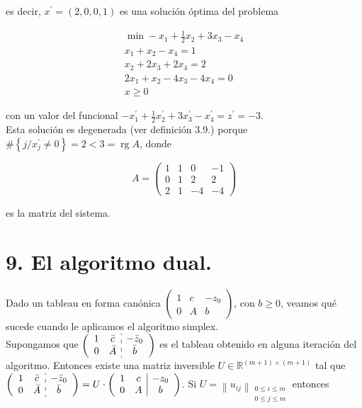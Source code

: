 \documentclass[10pt]{article}
\begin{document}
es decir, $x^{\prime}=(2,0,0,1)$ es una solución óptima del problema

$$
\begin{gathered}
\min -x_{1}+\frac{1}{2} x_{2}+3 x_{3}-x_{4} \\
x_{1}+x_{2}-x_{4}=1 \\
x_{2}+2 x_{3}+2 x_{4}=2 \\
2 x_{1}+x_{2}-4 x_{3}-4 x_{4}=0 \\
x \geq 0
\end{gathered}
$$

con un valor del funcional $-x_{1}^{\prime}+\frac{1}{2} x_{2}^{\prime}+3 x_{3}^{\prime}-x_{4}^{\prime}=z^{\prime}=-3$.\\
Esta solución es degenerada (ver definición 3.9.) porque $\#\left\{j / x_{j}^{\prime} \neq 0\right\}=2<3=\operatorname{rg} A$, donde

$$
A=\left(\begin{array}{cccc}
1 & 1 & 0 & -1 \\
0 & 1 & 2 & 2 \\
2 & 1 & -4 & -4
\end{array}\right)
$$

es la matriz del sistema.

\section*{9. El algoritmo dual.}
Dado un tableau en forma canónica $\left(\begin{array}{cc|c}1 & c & -z_{0} \\ 0 & A & b\end{array}\right)$, con $b \geq 0$, veamos qué sucede cuando le aplicamos el algoritmo simplex.\\
Supongamos que $\left(\begin{array}{cc:c}1 & \bar{c} & -\bar{z}_{0} \\ 0 & \bar{A} & \bar{b}\end{array}\right)$ es el tableau obtenido en alguna iteración del algoritmo. Entonces existe una matriz inversible $U \in \mathbb{R}^{(m+1) \times(m+1)}$ tal que $\left(\begin{array}{cc:c}1 & \bar{c} & -\bar{z}_{0} \\ 0 & \bar{A} & \bar{b}\end{array}\right)=U \cdot\left(\begin{array}{cc|c}1 & c & -z_{0} \\ 0 & A & b\end{array}\right)$. Si $U=\left\|u_{i j}\right\|_{\substack{0 \leq i \leq m \\ 0 \leq j \leq m}}$ entonces
\end{document}
